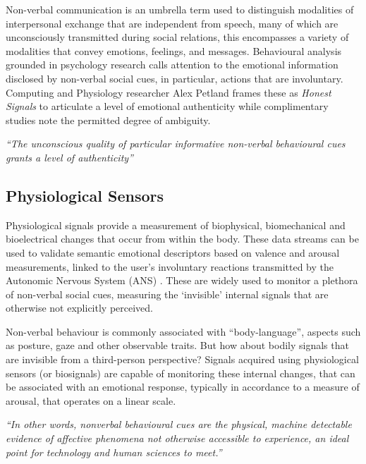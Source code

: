 Non-verbal communication is an umbrella term used to distinguish modalities of interpersonal exchange that are independent from speech, many of which are unconsciously transmitted during social relations, this encompasses a variety of modalities that convey emotions, feelings, and messages. Behavioural analysis grounded in psychology research calls attention to the emotional information disclosed by non-verbal social cues, in particular, actions that are involuntary. Computing and Physiology researcher Alex Petland frames these as \textit{Honest Signals} to articulate a level of emotional authenticity while complimentary studies note the permitted degree of ambiguity.

\textit{“The unconscious quality of particular informative non-verbal behavioural cues grants a level of authenticity”} \citeauthor{pentland_honest_2010} \cite{pentland_honest_2010}

\subsection{Physiological Sensors}

Physiological signals provide a measurement of biophysical, biomechanical and bioelectrical changes that occur from within the body. These data streams can be used to validate semantic emotional descriptors based on valence and arousal measurements, linked to the user’s involuntary reactions transmitted by the Autonomic Nervous System (ANS) \cite{levenson_autonomic_2014,shu_review_2018}. These are widely used to monitor a plethora of non-verbal social cues, measuring the ‘invisible’ internal signals that are otherwise not explicitly perceived.

Non-verbal behaviour is commonly associated with “body-language”, aspects such as posture, gaze and other observable traits. But how about bodily signals that are invisible from a third-person perspective? Signals acquired using physiological sensors (or biosignals) are capable of monitoring these internal changes, that can be associated with an emotional response, typically in accordance to a measure of arousal, that operates on a linear scale.

\textit{“In other words, nonverbal behavioural cues are the physical, machine detectable evidence of affective phenomena not otherwise accessible to experience, an ideal point for technology and human sciences to meet.”} \citeauthor{vinciarelli_towards_2011} \cite{vinciarelli_towards_2011}

